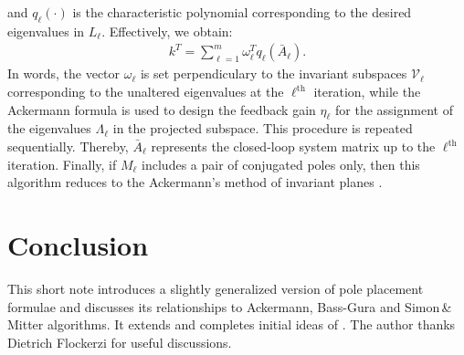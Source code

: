 \documentclass[conference]{IEEEtran}
\newcommand{\msv}{\mathcal{V}}
\newcommand{\om}{\omega}
\begin{document}
and $q_\ell(\cdot)$ is the characteristic polynomial corresponding to the desired eigenvalues in $L_\ell$.
Effectively, we obtain: \begin{align}
 k^T = \sum_{\ell=1}^m \om^T_{\ell} q_\ell(\bar A_\ell).
\label{eq:sequent}
\end{align}
In words, the vector $\om_\ell$ is set perpendiculary to the invariant
subspaces $\msv_\ell$ corresponding to the unaltered eigenvalues at
the $\ell^\text{th}$ iteration, while the Ackermann formula is used to
design the feedback gain $\eta_\ell$ for the assignment of the eigenvalues
$\varLambda_\ell$ in the projected subspace. This procedure is repeated
sequentially. Thereby, $\bar A_\ell$ represents the closed-loop system
matrix up to the $\ell^\text{th}$ iteration. Finally, if
$M_\ell$ includes a pair of conjugated poles only, then this algorithm
reduces to the Ackermann's method of invariant planes \cite{ackermann93}.

\vspace{-5pt}
\section{Conclusion}
This short note introduces a slightly
generalized version of pole placement formulae and discusses its
relationships to Ackermann, Bass-Gura and Simon\,\&\,Mitter
algorithms. It extends and completes initial ideas of \cite{BajAJC}. The author thanks Dietrich Flockerzi for  useful discussions.

\vspace{-5pt}



\end{document}
